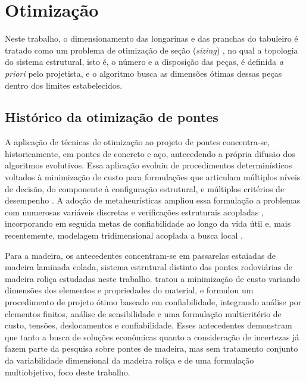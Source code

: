 \section{Otimização}\label{sec:otimizacao}

Neste trabalho, o dimensionamento das longarinas e das pranchas do tabuleiro é tratado como um problema de otimização de seção (\textit{sizing}) \parencite{BendsoeSigmund2003}, no qual a topologia do sistema estrutural, isto é, o número e a disposição das peças, é definida \textit{a priori} pelo projetista, e o algoritmo busca as dimensões ótimas dessas peças dentro dos limites estabelecidos.

\subsection{Histórico da otimização de pontes}\label{sec:historico_otimizacao_pontes}

A aplicação de técnicas de otimização ao projeto de pontes concentra-se, historicamente, em pontes de concreto e aço, antecedendo a própria difusão dos algoritmos evolutivos. Essa aplicação evoluiu de procedimentos determinísticos voltados à minimização de custo \parencite{Aguilar1973, Brar1984} para formulações que articulam múltiplos níveis de decisão, do componente à configuração estrutural, e múltiplos critérios de desempenho \parencite{CohnLounis1994, SimoesNegrao1994}.
A adoção de metaheurísticas ampliou essa formulação a problemas com numerosas variáveis discretas e verificações estruturais acopladas \parencite{Marti2013, GarciaSeguraYepes2016}, incorporando em seguida metas de confiabilidade ao longo da vida útil \parencite{GarciaSegura2017} e, mais recentemente, modelagem tridimensional acoplada a busca local \parencite{deMoraes2025}.

Para a madeira, os antecedentes concentram-se em passarelas estaiadas de madeira laminada colada, sistema estrutural distinto das pontes rodoviárias de madeira roliça estudadas neste trabalho. \textcite{Negrao1999} tratou a minimização de custo variando dimensões dos elementos e propriedades do material, e \textcite{SimoesNegrao2005} formulou um procedimento de projeto ótimo baseado em confiabilidade, integrando análise por elementos finitos, análise de sensibilidade e uma formulação multicritério de custo, tensões, deslocamentos e confiabilidade.
Esses antecedentes demonstram que tanto a busca de soluções econômicas quanto a consideração de incertezas já fazem parte da pesquisa sobre pontes de madeira, mas sem tratamento conjunto da variabilidade dimensional da madeira roliça e de uma formulação multiobjetivo, foco deste trabalho.


